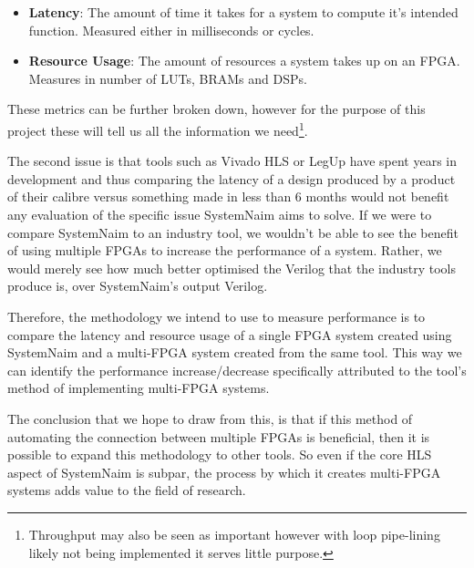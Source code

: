 \begin{itemize}
    \item \textbf{Latency}: The amount of time it takes for a system to compute it's intended function. Measured either in milliseconds or cycles.
    \item \textbf{Resource Usage}: The amount of resources a system takes up on an FPGA. Measures in number of LUTs, BRAMs and DSPs.
\end{itemize}

These metrics can be further broken down, however for the purpose of this project these will tell us all the information we need\footnote{Throughput may also be seen as important however with loop pipe-lining likely not being implemented it serves little purpose.}.

The second issue is that tools such as Vivado HLS or LegUp have spent years in development and thus comparing the latency of a design produced by a product of their calibre versus something made in less than 6 months would not benefit any evaluation of the specific issue SystemNaim aims to solve. If we were to compare SystemNaim to an industry tool, we wouldn't be able to see the benefit of using multiple FPGAs to increase the performance of a system. Rather, we would merely see how much better optimised the Verilog that the industry tools produce is, over SystemNaim's output Verilog.

Therefore, the methodology we intend to use to measure performance is to compare the latency and resource usage of a single FPGA system created using SystemNaim and a multi-FPGA system created from the same tool. This way we can identify the performance increase/decrease specifically attributed to the tool's method of implementing multi-FPGA systems. 

The conclusion that we hope to draw from this, is that if this method of automating the connection between multiple FPGAs is beneficial, then it is possible to expand this methodology to other tools. So even if the core HLS aspect of SystemNaim is subpar, the process by which it creates multi-FPGA systems adds value to the field of research.



